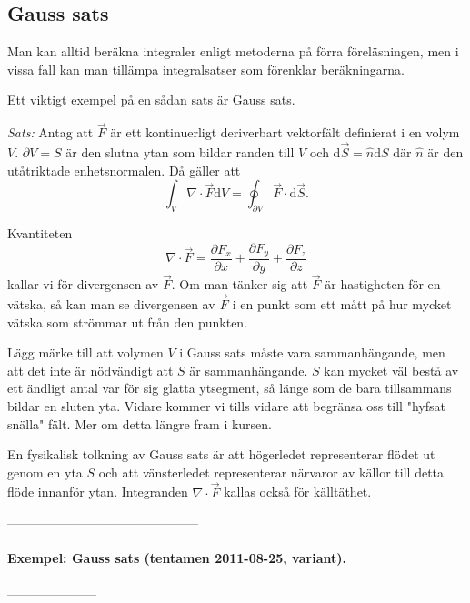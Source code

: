 \documentclass[%
oneside,                 %
final,                   %
10pt]{article}
\begin{document}
\subsection{Gauss sats}

Man kan alltid beräkna integraler enligt metoderna på förra föreläsningen, men i vissa fall kan man tillämpa integralsatser som förenklar beräkningarna.

Ett viktigt exempel på en sådan sats är Gauss sats.  

\emph{Sats:}  Antag att $\vec{F}$ är ett kontinuerligt deriverbart vektorfält definierat i en volym $V$. $\partial V = S$ är den slutna ytan som bildar randen till $V$ och $\mbox{d}\vec{S} = \hat{n} \mbox{d}S$ där $\hat{n}$ är den utåtriktade enhetsnormalen. Då gäller att
\begin{equation}
  \int_V \nabla \cdot \vec{F} \mbox{d}V = \oint_{\partial V} \vec{F} \cdot \mbox{d} \vec{S}.
\end{equation}

Kvantiteten
\begin{equation}
\nabla  \cdot \vec{F} = \frac{\partial F_x}{\partial x} +
\frac{\partial F_y}{\partial y} + \frac{\partial F_z}{\partial z}
\end{equation}
kallar vi för divergensen av $\vec{F}$. Om man tänker sig att $\vec{F}$ är hastigheten för en vätska, så kan man se divergensen av $\vec{F}$ i en punkt som ett mått på hur mycket vätska som strömmar ut från den punkten.

Lägg märke till att volymen $V$ i Gauss sats måste vara sammanhängande, men att det inte är nödvändigt att $S$ är sammanhängande.  $S$ kan mycket väl bestå av ett ändligt antal var för sig glatta ytsegment, så länge som de bara tillsammans bildar en sluten yta. Vidare kommer vi tills vidare att begränsa oss till "hyfsat snälla" fält. Mer om detta längre fram i kursen.

En fysikalisk tolkning av Gauss sats är att högerledet representerar flödet ut genom en yta $S$ och att vänsterledet representerar närvaror av källor till detta flöde innanför ytan. Integranden $\nabla \cdot \vec{F}$ kallas också för källtäthet.

---------------------------------------------

\paragraph{Exempel: Gauss sats (tentamen 2011-08-25, variant).}
---------------------
\end{document}
